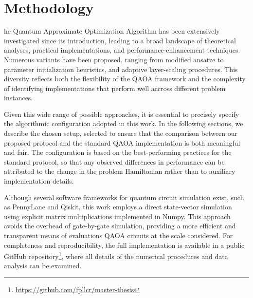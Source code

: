 \chapter{Methodology}
\label{Chapter:Methodology}

he Quantum Approximate Optimization Algorithm has been extensively investigated
since its introduction, leading to a broad landscape of theoretical analyses, practical 
implementations, and performance-enhancement techniques. Numerous variants have been proposed,
ranging from modified ansatze to parameter initialization heuristics, and adaptive layer-scaling
procedures. This diversity reflects both the flexibility of the QAOA framework and the
complexity of identifying implementations that perform well accross different problem
instances.

Given this wide range of possible approaches, it is essential to precisely specify
the algorithmic configuration adopted in this work. In the following sections, we describe
the chosen setup, selected to ensure that the comparison between our proposed protocol and
the standard QAOA implementation is both meaningful and fair. The configuration is based
on the best-performing practices for the standard protocol, so that any observed differences
in performance can be attributed to the change in the problem Hamiltonian rather than to
auxiliary implementation details.

Although several software frameworks for quantum circuit simulation exist, such as PennyLane
and Qiskit, this work employs a direct state-vector simulation using explicit matrix
multiplications implemented in Numpy. This approach avoids the overhead of gate-by-gate
simulation, providing a more efficient and transparent means of evaluations QAOA circuits
at the scale considered. For completeness and reproducibility, the full implementation
is available in a public GitHub repository\footnote{\url{https://github.com/fpllcr/master-thesis}},
where all details of the numerical procedures and data analysis can be examined.